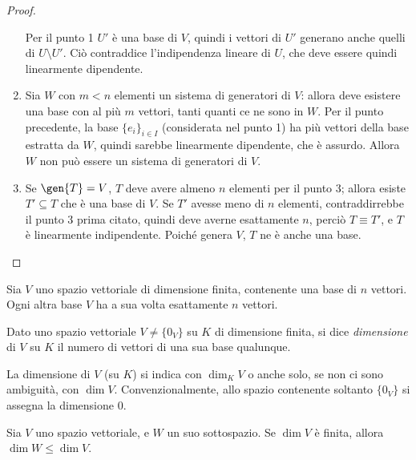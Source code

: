 \begin{proof}
\begin{enumerate}
			Per il punto 1 $U'$ è una base di $V$, quindi i vettori di $U'$ generano anche quelli di $U\setminus U'$.
			Ciò contraddice l'indipendenza lineare di $U$, che deve essere quindi linearmente dipendente.
		\item Sia $W$ con $m<n$ elementi un sistema di generatori di $V$: allora deve esistere una base con al più $m$ vettori, tanti quanti ce ne sono in $W$.
			Per il punto precedente, la base $\{  e_i\}_{i\in I}$ (considerata nel punto 1) ha più vettori della base estratta da $W$, quindi sarebbe linearmente dipendente, che è assurdo.
			Allora $W$ non può essere un sistema di generatori di $V$.
		\item Se $\gen{T}=V$, $T$ deve avere almeno $n$ elementi per il punto 3; allora esiste $T'\subseteq T$ che è una base di $V$.
			Se $T'$ avesse meno di $n$ elementi, contraddirrebbe il punto 3 prima citato, quindi deve averne esattamente $n$, perciò $T\equiv T'$, e $T$ è linearmente indipendente.
			Poiché genera $V$, $T$ ne è anche una base.
	\end{enumerate}
\end{proof}
\begin{corollario}
	Sia $V$ uno spazio vettoriale di dimensione finita, contenente una base di $n$ vettori.
	Ogni altra base $V$ ha a sua volta esattamente $n$ vettori.
\end{corollario}
\begin{definizione} \label{d:dimensione}
	Dato uno spazio vettoriale $V\neq\{0_V\}$ su $K$ di dimensione finita, si dice \emph{dimensione} di $V$ su $K$ il numero di vettori di una sua base qualunque.
\end{definizione}
La dimensione di $V$ (su $K$) si indica con $\dim_KV$ o anche solo, se non ci sono ambiguità, con $\dim V$. Convenzionalmente, allo spazio contenente soltanto $\{0_V\}$ si assegna la dimensione 0.
\begin{teorema}
	Sia $V$ uno spazio vettoriale, e $W$ un suo sottospazio.
	Se $\dim V$ è finita, allora $\dim W\leq\dim V$.
\end{teorema}
